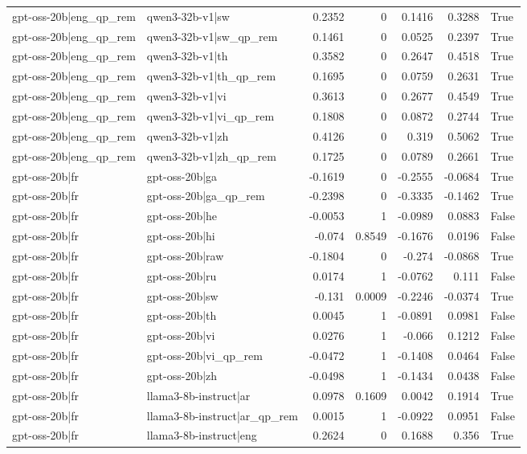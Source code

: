 \begin{table}
\begin{tabular}{l l r r r r l}
gpt-oss-20b|eng_qp_rem & qwen3-32b-v1|sw & 0.2352 & 0 & 0.1416 & 0.3288 & True \\
gpt-oss-20b|eng_qp_rem & qwen3-32b-v1|sw_qp_rem & 0.1461 & 0 & 0.0525 & 0.2397 & True \\
gpt-oss-20b|eng_qp_rem & qwen3-32b-v1|th & 0.3582 & 0 & 0.2647 & 0.4518 & True \\
gpt-oss-20b|eng_qp_rem & qwen3-32b-v1|th_qp_rem & 0.1695 & 0 & 0.0759 & 0.2631 & True \\
gpt-oss-20b|eng_qp_rem & qwen3-32b-v1|vi & 0.3613 & 0 & 0.2677 & 0.4549 & True \\
gpt-oss-20b|eng_qp_rem & qwen3-32b-v1|vi_qp_rem & 0.1808 & 0 & 0.0872 & 0.2744 & True \\
gpt-oss-20b|eng_qp_rem & qwen3-32b-v1|zh & 0.4126 & 0 & 0.319 & 0.5062 & True \\
gpt-oss-20b|eng_qp_rem & qwen3-32b-v1|zh_qp_rem & 0.1725 & 0 & 0.0789 & 0.2661 & True \\
gpt-oss-20b|fr & gpt-oss-20b|ga & -0.1619 & 0 & -0.2555 & -0.0684 & True \\
gpt-oss-20b|fr & gpt-oss-20b|ga_qp_rem & -0.2398 & 0 & -0.3335 & -0.1462 & True \\
gpt-oss-20b|fr & gpt-oss-20b|he & -0.0053 & 1 & -0.0989 & 0.0883 & False \\
gpt-oss-20b|fr & gpt-oss-20b|hi & -0.074 & 0.8549 & -0.1676 & 0.0196 & False \\
gpt-oss-20b|fr & gpt-oss-20b|raw & -0.1804 & 0 & -0.274 & -0.0868 & True \\
gpt-oss-20b|fr & gpt-oss-20b|ru & 0.0174 & 1 & -0.0762 & 0.111 & False \\
gpt-oss-20b|fr & gpt-oss-20b|sw & -0.131 & 0.0009 & -0.2246 & -0.0374 & True \\
gpt-oss-20b|fr & gpt-oss-20b|th & 0.0045 & 1 & -0.0891 & 0.0981 & False \\
gpt-oss-20b|fr & gpt-oss-20b|vi & 0.0276 & 1 & -0.066 & 0.1212 & False \\
gpt-oss-20b|fr & gpt-oss-20b|vi_qp_rem & -0.0472 & 1 & -0.1408 & 0.0464 & False \\
gpt-oss-20b|fr & gpt-oss-20b|zh & -0.0498 & 1 & -0.1434 & 0.0438 & False \\
gpt-oss-20b|fr & llama3-8b-instruct|ar & 0.0978 & 0.1609 & 0.0042 & 0.1914 & True \\
gpt-oss-20b|fr & llama3-8b-instruct|ar_qp_rem & 0.0015 & 1 & -0.0922 & 0.0951 & False \\
gpt-oss-20b|fr & llama3-8b-instruct|eng & 0.2624 & 0 & 0.1688 & 0.356 & True \\

\end{tabular}
\end{table}
